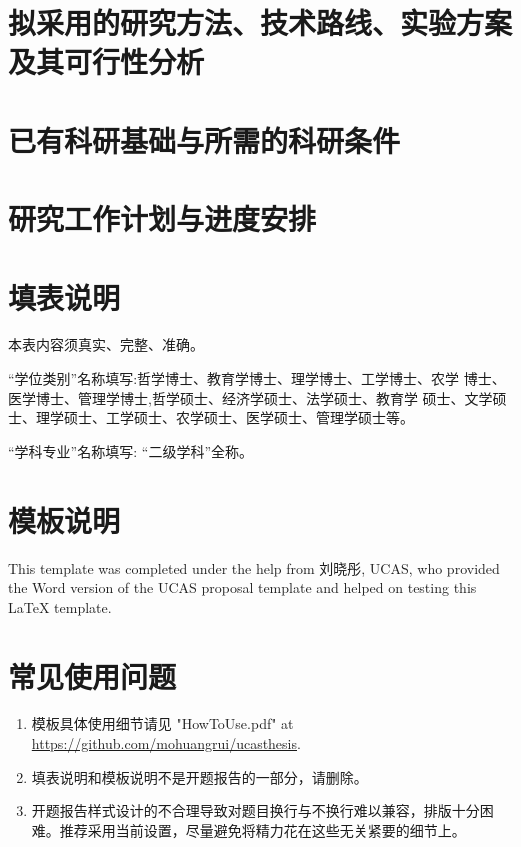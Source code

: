 \section{拟采用的研究方法、技术路线、实验方案及其可行性分析}

\section{已有科研基础与所需的科研条件}

\section{研究工作计划与进度安排}

\section*{填表说明}

本表内容须真实、完整、准确。

“学位类别”名称填写:哲学博士、教育学博士、理学博士、工学博士、农学 博士、医学博士、管理学博士,哲学硕士、经济学硕士、法学硕士、教育学 硕士、文学硕士、理学硕士、工学硕士、农学硕士、医学硕士、管理学硕士等。

“学科专业”名称填写: “二级学科”全称。

\section*{模板说明}

This template was completed under the help from 刘晓彤, UCAS, who provided the Word version of the UCAS proposal template and helped on testing this \LaTeX{} template.

\section*{常见使用问题}

\begin{enumerate}
    \item 模板具体使用细节请见 "HowToUse.pdf" at \url{https://github.com/mohuangrui/ucasthesis}.
    \item 填表说明和模板说明不是开题报告的一部分，请删除。
    \item 开题报告样式设计的不合理导致对题目换行与不换行难以兼容，排版十分困难。推荐采用当前设置，尽量避免将精力花在这些无关紧要的细节上。
\end{enumerate}

\nocite{*}%

